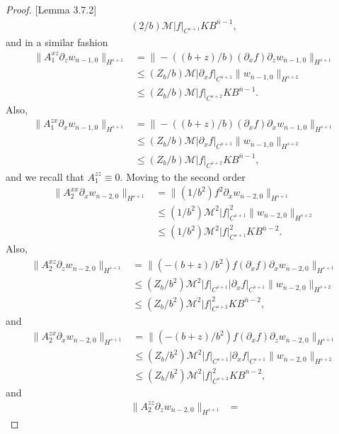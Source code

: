 \begin{proof}{[Lemma 3.7.2]}
\begin{align*}
(2/b)\mathcal{M}|f|_{C^{s+1}}KB^{\overline{n}-1},
\end{align*}
and in a similar fashion
\begin{align*}
\|A_1^{xz}\partial_z w_{\overline{n}-1,0}\|_{H^{s+1}} &= 
\|-((b+z)/b)(\partial_x f)\partial_z w_{\overline{n}-1,0}\|_{H^{s+1}}\\&\le
(Z_b/b)\mathcal{M}|\partial_x f|_{C^{s+1}}\|w_{\overline{n}-1, 0}\|_{H^{s+2}} \\&\le
(Z_b/b)\mathcal{M}|f|_{C^{s+2}}KB^{\overline{n}-1}.
\end{align*}
Also,
\begin{align*}
\|A_1^{zx}\partial_x w_{\overline{n}-1,0}\|_{H^{s+1}} &= 
\|-((b+z)/b)(\partial_x f)\partial_x w_{\overline{n}-1,0}\|_{H^{s+1}}\\&\le
(Z_b/b)\mathcal{M}|\partial_x f|_{C^{s+1}}\|w_{\overline{n}-1, 0}\|_{H^{s+2}} \\&\le
(Z_b/b)\mathcal{M}|f|_{C^{s+2}}KB^{\overline{n}-1},
\end{align*}
and we recall that $A_1^{zz}\equiv 0$. Moving to the second order
\begin{align*}
\|A_2^{xx}\partial_x w_{\overline{n}-2,0}\|_{H^{s+1}} &= 
\|(1/b^2)f^2\partial_x w_{\overline{n}-2,0}\|_{H^{s+1}}\\&\le
(1/b^2)\mathcal{M}^2|f|_{C^{s+1}}^2\|w_{\overline{n}-2, 0}\|_{H^{s+2}} \\&\le
(1/b^2)\mathcal{M}^2|f|_{C^{s+1}}^2KB^{\overline{n}-2}.
\end{align*}
Also,
\begin{align*}
\|A_2^{xz}\partial_z w_{\overline{n}-2,0}\|_{H^{s+1}} &= 
\|(-(b+z)/b^2)f(\partial_x f)\partial_x w_{\overline{n}-2,0}\|_{H^{s+1}}\\&\le
(Z_b/b^2)\mathcal{M}^2|f|_{C^{s+1}}|\partial_x f|_{C^{s+1}}\|w_{\overline{n}-2, 0}\|_{H^{s+2}} \\&\le
(Z_b/b^2)\mathcal{M}^2|f|_{C^{s+2}}^2KB^{\overline{n}-2},
\end{align*}
and
\begin{align*}
\|A_2^{zx}\partial_x w_{\overline{n}-2,0}\|_{H^{s+1}} &= 
\|(-(b+z)/b^2)f(\partial_x f)\partial_z w_{\overline{n}-2,0}\|_{H^{s+1}}\\&\le
(Z_b/b^2)\mathcal{M}^2|f|_{C^{s+1}}|\partial_x f|_{C^{s+1}}\|w_{\overline{n}-2, 0}\|_{H^{s+2}} \\&\le
(Z_b/b^2)\mathcal{M}^2|f|_{C^{s+2}}^2KB^{\overline{n}-2},
\end{align*}
and
\begin{align*}
\|A_2^{zz}\partial_z w_{\overline{n}-2,0}\|_{H^{s+1}} &= 

\end{align*}
\end{proof}

